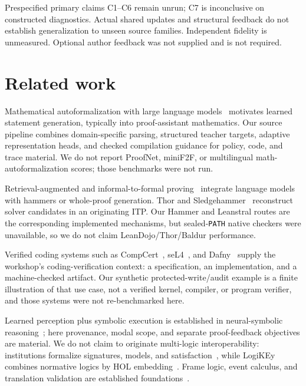 \documentclass{article}
\begin{document}
Prespecified primary claims C1--C6 remain unrun; C7 is inconclusive on constructed diagnostics. Actual shared updates and structural feedback do not establish generalization to unseen source families. Independent fidelity is unmeasured. Optional author feedback was not supplied and is not required.

\section{Related work}
Mathematical autoformalization with large language models~\citep{wu2022autoformalization,azerbayev2023proofnet,jiang2024multilanguage} motivates learned statement generation, typically into proof-assistant mathematics. Our source pipeline combines domain-specific parsing, structured teacher targets, adaptive representation heads, and checked compilation guidance for policy, code, and trace material. We do not report ProofNet, miniF2F, or multilingual math-autoformalization scores; those benchmarks were not run.

Retrieval-augmented and informal-to-formal proving~\citep{jiang2022thor,jiang2023dsp,yang2023leandojo,first2023baldur} integrate language models with hammers or whole-proof generation. Thor and Sledgehammer~\citep{blanchette2013sledgehammer} reconstruct solver candidates in an originating ITP. Our Hammer and Leanstral routes are the corresponding implemented mechanisms, but sealed-\texttt{PATH} native checkers were unavailable, so we do not claim LeanDojo/Thor/Baldur performance.

Verified coding systems such as CompCert~\citep{leroy2009compcert}, seL4~\citep{klein2009sel4}, and Dafny~\citep{leino2010dafny} supply the workshop's coding-verification context: a specification, an implementation, and a machine-checked artifact. Our synthetic protected-write/audit example is a finite illustration of that use case, not a verified kernel, compiler, or program verifier, and those systems were not re-benchmarked here.

Learned perception plus symbolic execution is established in neural-symbolic reasoning~\citep{yi2018nsvqa}; here provenance, modal scope, and separate proof-feedback objectives are material. We do not claim to originate multi-logic interoperability: institutions formalize signatures, models, and satisfaction~\citep{goguen1992institutions}, while LogiKEy combines normative logics by HOL embedding~\citep{benzmuller2020logikey}. Frame logic, event calculus, and translation validation are established foundations~\citep{kifer1995flogic,kowalski1986events,pnueli1998translation}.
\end{document}
